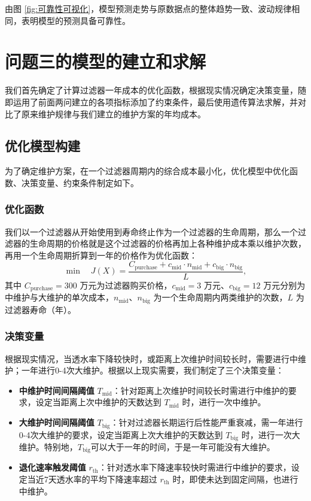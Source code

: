 \documentclass[withoutpreface,bwprint]{cumcmthesis}
\begin{document}
由图 \ref {fig:可靠性可视化}，模型预测走势与原数据点的整体趋势一致、波动规律相同，表明模型的预测具备可靠性。





\section{问题三的模型的建立和求解}

我们首先确定了计算过滤器一年成本的优化函数，根据现实情况确定决策变量，随即运用了前面两问建立的各项指标添加了约束条件，最后使用遗传算法求解，并对比了原来维护规律与我们建立的维护方案的年均成本。

\subsection{优化模型构建}

为了确定维护方案，在一个过滤器周期内的综合成本最小化，优化模型中优化函数、决策变量、约束条件制定如下。

\subsubsection{优化函数}

我们以一个过滤器从开始使用到寿命终止作为一个过滤器的生命周期，那么一个过滤器的生命周期的价格就是这个过滤器的价格再加上各种维护成本乘以维护次数，再用一个生命周期折算到一年的价格作为优化函数：
\begin{equation}
	\min \quad J(X) = \frac{C_{\text{purchase}} + c_{\text{mid}} \cdot n_{\text{mid}} + c_{\text{big}} \cdot n_{\text{big}}}{L},
\end{equation}
其中 $C_{\text{purchase}} = 300$ 万元为过滤器购买价格，$c_{\text{mid}} = 3$ 万元、$c_{\text{big}} = 12$ 万元分别为中维护与大维护的单次成本，$n_{\text{mid}}$、$n_{\text{big}}$ 为一个生命周期内两类维护的次数，$L$ 为过滤器寿命（年）。


\subsubsection{决策变量}

根据现实情况，当透水率下降较快时，或距离上次维护时间较长时，需要进行中维护；一年进行0-4次大维护。根据以上现实需要，我们制定了三个决策变量：
\begin{itemize}
	\item \textbf{中维护时间间隔阈值} $T_{\text{mid}}$：针对距离上次维护时间较长时需进行中维护的要求，设定当距离上次中维护的天数达到 $T_{\text{mid}}$ 时，进行一次中维护。
	\item \textbf{大维护时间间隔阈值} $T_{\text{big}}$：针对过滤器长期运行后性能严重衰减，需一年进行0-4次大维护的要求，设定当距离上次大维护的天数达到 $T_{\text{big}}$ 时，进行一次大维护。特别地，$T_{\text{big}}$可以大于一年的时间，于是一年可能没有大维护。
	\item \textbf{退化速率触发阈值} $r_{\text{th}}$：针对透水率下降速率较快时需进行中维护的要求，设定当近7天透水率的平均下降速率超过 $r_{\text{th}}$ 时，即使未达到固定间隔，也进行中维护。
\end{itemize}
\end{document}
